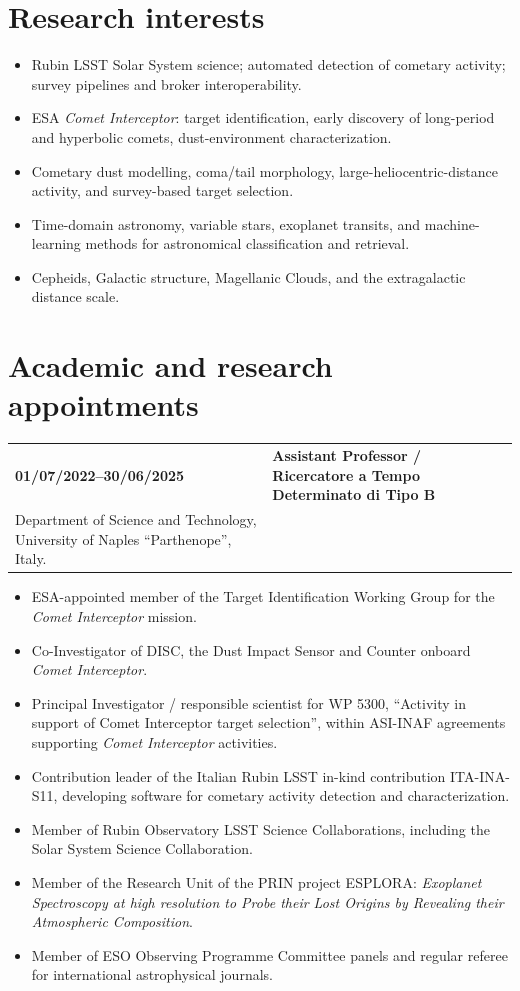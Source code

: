 \documentclass[11pt,a4paper]{article}
\makeatletter
\newcommand{\cvitem}[2]{\begin{tabularx}{\textwidth}{@{}p{3.1cm}X@{}}\textbf{#1} & #2 \\ \end{tabularx}}
\newcommand{\role}[3]{\cvitem{#1}{\textbf{#2}\\#3}}
\makeatother
\begin{document}
\section*{Research interests}
\begin{itemize}
    \item Rubin LSST Solar System science; automated detection of cometary activity; survey pipelines and broker interoperability.
    \item ESA \textit{Comet Interceptor}: target identification, early discovery of long-period and hyperbolic comets, dust-environment characterization.
    \item Cometary dust modelling, coma/tail morphology, large-heliocentric-distance activity, and survey-based target selection.
    \item Time-domain astronomy, variable stars, exoplanet transits, and machine-learning methods for astronomical classification and retrieval.
    \item Cepheids, Galactic structure, Magellanic Clouds, and the extragalactic distance scale.
\end{itemize}

\section*{Academic and research appointments}
\role{01/07/2022--30/06/2025}{Assistant Professor / Ricercatore a Tempo Determinato di Tipo B}{Department of Science and Technology, University of Naples ``Parthenope'', Italy.}
\begin{itemize}
    \item ESA-appointed member of the Target Identification Working Group for the \textit{Comet Interceptor} mission.
    \item Co-Investigator of DISC, the Dust Impact Sensor and Counter onboard \textit{Comet Interceptor}.
    \item Principal Investigator / responsible scientist for WP 5300, ``Activity in support of Comet Interceptor target selection'', within ASI-INAF agreements supporting \textit{Comet Interceptor} activities.
    \item Contribution leader of the Italian Rubin LSST in-kind contribution ITA-INA-S11, developing software for cometary activity detection and characterization.
    \item Member of Rubin Observatory LSST Science Collaborations, including the Solar System Science Collaboration.
    \item Member of the Research Unit of the PRIN project ESPLORA: \textit{Exoplanet Spectroscopy at high resolution to Probe their Lost Origins by Revealing their Atmospheric Composition}.
    \item Member of ESO Observing Programme Committee panels and regular referee for international astrophysical journals.
\end{itemize}
\end{document}
